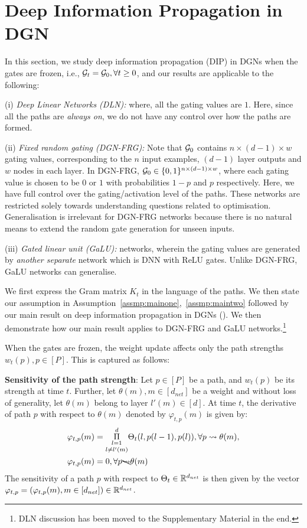 \section{Deep Information Propagation in DGN}\label{sec:optimisation}
In this section, we study deep information propagation (DIP) in DGNs when the gates are frozen, i.e., $\mathcal{G}_t=\mathcal{G}_0,\forall t\geq 0$, and our results are applicable to the following:

(i) \emph{Deep Linear Networks (DLN):} where, all the gating values are $1$. Here, since all the paths are \emph{always on}, we do not have any control over how the paths are formed.

(ii) \emph{Fixed random gating (DGN-FRG):} Note that $\mathcal{G}_0$ contains $n\times (d-1)\times w$ gating values, corresponding to the $n$ input examples, $(d-1)$ layer outputs and $w$ nodes in each layer. In DGN-FRG, $\mathcal{G}_0\in \{0,1\}^{n\times (d-1)\times w}$, where each gating value is chosen to be $0$ or $1$ with probabilities $1-p$ and $p$ respectively. Here, we have full control over the gating/activation level of the paths. These networks are restricted solely towards understanding questions related to optimisation. Generalisation is irrelevant for DGN-FRG networks because there is no natural means to extend the random gate generation for unseen inputs.

(iii) \emph{Gated linear unit (GaLU):} networks, wherein the gating values are generated by \emph{another separate} network which is DNN with ReLU gates. Unlike DGN-FRG, GaLU networks can generalise.

We first express the Gram matrix $K_t$ in the language of the paths. We then state our assumption in Assumption~\ref{assmp:mainone},~\ref{assmp:maintwo} followed by our main result on deep information propagation in DGNs (). We then demonstrate how our main result applies to DGN-FRG and GaLU networks.\footnote{DLN discussion has been moved to the Supplementary Material in the end.}

When the gates are frozen, the weight update affects only the path strengths $w_t(p),p\in[P]$. This is captured as follows:

\textbf{Sensitivity of the path strength}: Let $p\in[P]$ be a path, and $w_t(p)$ be its strength at time $t$. Further, let $\theta(m),m\in[d_{net}]$ be a weight and without loss of generality, let $\theta(m)$ belong to layer $l'(m)\in[d]$. At time $t$, the derivative of path $p$ with respect to $\theta(m)$ denoted by $\varphi_{t,p}(m)$ is given by:
\begin{align}
\begin{split}
\varphi_{t,p}(m)&=\underset{l\neq l'(m)}{\underset{l=1}{\overset{d}{\Pi}}} \Theta_t(l,p(l-1),p(l)), \forall p\rightsquigarrow\theta(m),\\
\varphi_{t,p}(m)&=0, \forall p\bcancel{\rightsquigarrow}\theta(m)
\end{split}
\end{align}
The sensitivity of a path $p$ with respect to $\Theta_t\in\mathbb{R}^{d_{net}}$ is then given by the vector $\varphi_{t,p}=(\varphi_{t,p}(m),m\in[d_{net}])\in \mathbb{R}^{d_{net}}$.

